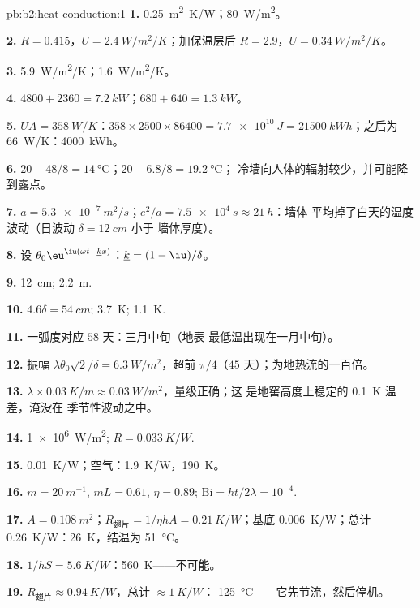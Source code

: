 \begin{solution}{pb:b2:heat-conduction:1}
\textbf{1.} \qty{0.25}{m^2.K/W}；\qty{80}{W/m^2}。

\textbf{2.} $R = 0.415$，$U = \qty{2.4}{W/m^2/K}$；加保温层后 $R = 2.9$，$U =
\qty{0.34}{W/m^2/K}$。

\textbf{3.} \qty{5.9}{W/m^2/K}；\qty{1.6}{W/m^2/K}。

\textbf{4.} $4800 + 2360 = \qty{7.2}{kW}$；$680 + 640 = \qty{1.3}{kW}$。

\textbf{5.} $UA = \qty{358}{W/K}$：$358 \times 2500 \times 86400 = \qty{7.7e10}{J} =
\qty{21500}{kWh}$；之后为 \qty{66}{W/K}：\qty{4000}{kWh}。

\textbf{6.} $20 - 48/8 = \qty{14}{\celsius}$；$20 - 6.8/8 = \qty{19.2}{\celsius}$；
冷墙向人体的辐射较少，并可能降到露点。

\textbf{7.} $a = \qty{5.3e-7}{m^2/s}$；$e^2/a = \qty{7.5e4}{s} \approx \qty{21}{h}$：墙体
平均掉了白天的温度波动（日波动 $\delta = \qty{12}{cm}$ 小于
墙体厚度）。

\textbf{8.} 设 $\theta_0\eu^{\iu(\omega t - \underline kx)}$：$\underline k = (1 - \iu)/\delta$。

\textbf{9.} \qty{12}{cm}; \qty{2.2}{m}.

\textbf{10.} $4.6\delta = \qty{54}{cm}$; \qty{3.7}{K}; \qty{1.1}{K}.

\textbf{11.} 一弧度对应 $58$ 天：三月中旬（地表
最低温出现在一月中旬）。

\textbf{12.} 振幅 $\lambda\theta_0\sqrt2/\delta = \qty{6.3}{W/m^2}$，超前
$\pi/4$（$45$ 天）；为地热流的一百倍。

\textbf{13.} $\lambda \times \qty{0.03}{K/m} \approx \qty{0.03}{W/m^2}$，量级正确；这
是地窖高度上稳定的 \qty{0.1}{K} 温差，淹没在
季节性波动之中。

\textbf{14.} \qty{1e6}{W/m^2}; $R = \qty{0.033}{K/W}$.

\textbf{15.} \qty{0.01}{K/W}；空气：\qty{1.9}{K/W}，\qty{190}{K}。

\textbf{16.} $m = \qty{20}{m^{-1}}$, $mL = 0.61$, $\eta = 0.89$; $\mathrm{Bi} = ht/2\lambda
= 10^{-4}$.

\textbf{17.} $A = \qty{0.108}{m^2}$；$R_{\text{翅片}} = 1/\eta hA = \qty{0.21}{K/W}$；基底
\qty{0.006}{K/W}；总计 \qty{0.26}{K/W}：\qty{26}{K}，结温为 \qty{51}{\celsius}。

\textbf{18.} $1/hS = \qty{5.6}{K/W}$：\qty{560}{K}——不可能。

\textbf{19.} $R_{\text{翅片}} \approx \qty{0.94}{K/W}$，总计 $\approx \qty{1}{K/W}$：
\qty{125}{\celsius}——它先节流，然后停机。


\end{solution}
